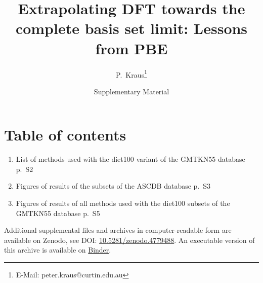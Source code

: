 \documentclass[12pt]{article}
\newcommand{\beginsupplement}{%
        \setcounter{table}{0}
        \renewcommand{\thetable}{S\arabic{table}}%
        \setcounter{figure}{0}
        \renewcommand{\thefigure}{S\arabic{figure}}%
        \renewcommand{\thepage}{S\arabic{page}}%
     }
\begin{document}
\title{Extrapolating DFT towards the complete basis set limit: Lessons from PBE}

\date{Supplementary Material}

\author{P.~Kraus\thanks{E-Mail: peter.kraus@curtin.edu.au}}

\maketitle




\beginsupplement

\section*{Table of contents}
\begin{enumerate}
	\item List of methods used with the diet100 variant of the GMTKN55 database \hfill p.~S2
	\item Figures of results of the subsets of the ASCDB database \hfill p.~S3
    \item Figures of results of all methods used with the diet100 subsets of the GMTKN55 database \hfill p.~S5
\end{enumerate}

Additional supplemental files and archives in computer-readable form are available on Zenodo, see DOI: \href{http://dx.doi.org/10.5281/zenodo.4779488}{10.5281/zenodo.4779488}. An executable version of this archive is available on \href{https://mybinder.org/v2/zenodo/10.5281/zenodo.4779488/?filepath=index.ipynb}{Binder}.
\end{document}
